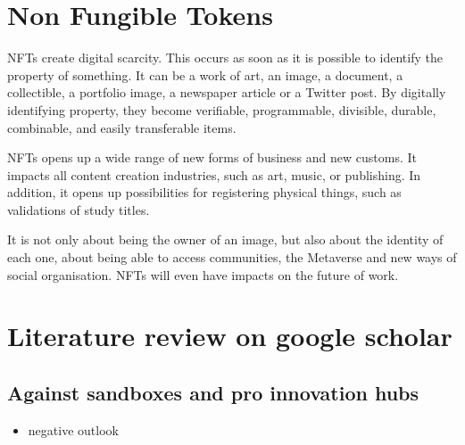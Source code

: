 \documentclass[
]{book}
\providecommand{\tightlist}{%
  \setlength{\itemsep}{0pt}\setlength{\parskip}{0pt}}
\begin{document}
\hypertarget{non-fungible-tokens}{%
\section{Non Fungible Tokens}\label{non-fungible-tokens}}

NFTs create digital scarcity. This occurs as soon as it is possible to identify the property of something. It can be a work of art, an image, a document, a collectible, a portfolio image, a newspaper article or a Twitter post. By digitally identifying property, they become verifiable, programmable, divisible, durable, combinable, and easily transferable items.

NFTs opens up a wide range of new forms of business and new customs. It impacts all content creation industries, such as art, music, or publishing. In addition, it opens up possibilities for registering physical things, such as validations of study titles.

It is not only about being the owner of an image, but also about the identity of each one, about being able to access communities, the Metaverse and new ways of social organisation.
NFTs will even have impacts on the future of work.

\hypertarget{literature-review-on-google-scholar}{%
\section{Literature review on google scholar}\label{literature-review-on-google-scholar}}

\hypertarget{against-sandboxes-and-pro-innovation-hubs}{%
\subsection{Against sandboxes and pro innovation hubs}\label{against-sandboxes-and-pro-innovation-hubs}}

\begin{itemize}
\tightlist
\item
  negative outlook
\end{itemize}
\end{document}

